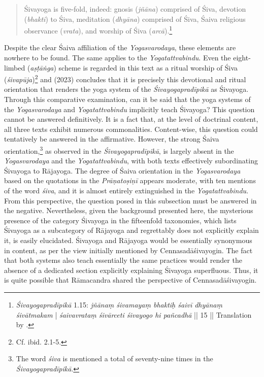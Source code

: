 \begin{quote}
  Śivayoga is five-fold, indeed: gnosis (\textit{jñāna}) comprised of Śiva, devotion (\textit{bhakti}) to Śiva,
meditation (\textit{dhyāna}) comprised of Śiva, Śaiva religious observance (\textit{vrata}), and worship of Śiva
(\textit{arcā}).\footnote{\textit{Śivayogapradīpikā} 1.15: \textit{jñānaṃ śivamayaṃ bhaktiḥ śaivī dhyānaṃ śivātmakam} | \textit{śaivavrataṃ śivārceti śivayogo hi pañcadhā} || 15 || Translation by \citeauthor[2023: 315]{powell2023}.} 
  \end{quote}
Despite the clear Śaiva affiliation of the \textit{Yogasvarodaya}, these elements are nowhere to be found. The same applies to the \textit{Yogatattvabindu}. Even the eight-limbed (\textit{aṣṭāṅga}) scheme is regarded in this text as a ritual worship of Śiva (\textit{śivapūja})\footnote{Cf. ibid. 2.1-5.} and \citeauthor{powell2023} (2023) concludes that it is precisely this devotional and ritual orientation that renders the yoga system of the \textit{Śivayogapradīpikā} as Śivayoga.
Through this comparative examination, can it be said that the yoga systems of the \textit{Yogasvarodaya} and \textit{Yogatattvabindu} implicitly teach Śivayoga? This question cannot be answered definitively. It is a fact that, at the level of doctrinal content, all three texts exhibit numerous commonalities. Content-wise, this question could tentatively be answered in the affirmative. However, the strong Śaiva orientation,\footnote{The word \textit{śiva} is mentioned a total of seventy-nine times in the \textit{Śivayogapradīpikā}.} as observed in the \textit{Śivayogapradīpikā}, is largely absent in the \textit{Yogasvarodaya} and the \textit{Yogatattvabindu}, with both texts effectively subordinating Śivayoga to Rājayoga. The degree of Śaiva orientation in the \textit{Yogasvarodaya} based on the quotations in the \emph{Prāṇatoṣiṇī} appears moderate, with ten mentions of the word \textit{śiva}, and it is almost entirely extinguished in the \textit{Yogatattvabindu}. From this perspective, the question posed in this subsection must be answered in the negative. Nevertheless, given the background presented here, the mysterious presence of the category Śivayoga in the fifteenfold taxonomies, which lists Śivayoga as a subcategory of Rājayoga and regrettably does not explicitly explain it, is easily elucidated. Śivayoga and Rājayoga would be essentially synonymous in content, as per the view initially mentioned by Cennasadāśivayogin. The fact that both systems also teach essentially the same practices would render the absence of a dedicated section explicitly explaining Śivayoga superfluous. Thus, it is quite possible that Rāmacandra shared the perspective of Cennasadāśivayogin.
